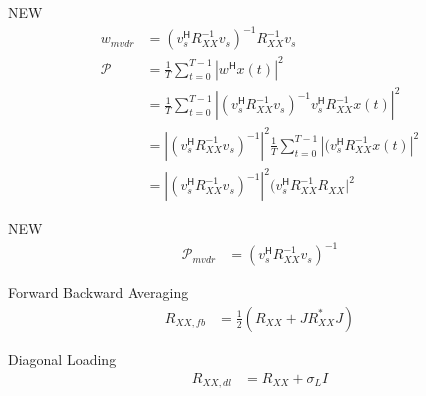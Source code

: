 \documentclass{article}
\begin{document}
NEW
\begin{align*}
	w_{mvdr} &= (v_s^\mathsf{H} R_{XX}^{-1} v_s)^{-1} R_{XX}^{-1} v_s 
	\\
	\mathcal{P} &= \frac{1}{T} \sum_{t=0}^{T-1} | w^\mathsf{H} x(t) | ^2
	\\
	&= \frac{1}{T} \sum_{t=0}^{T-1} | (v_s^\mathsf{H} R_{XX}^{-1} v_s)^{-1} v_s ^\mathsf{H} R_{XX}^{-1}  x(t) | ^2
	\\
	&= \left| (v_s^\mathsf{H} R_{XX}^{-1} v_s)^{-1} \right| ^ 2 \frac{1}{T} \sum_{t=0}^{T-1} | ( v_s ^\mathsf{H} R_{XX}^{-1}  x(t) | ^2
	\\
	&= \left| (v_s^\mathsf{H} R_{XX}^{-1} v_s)^{-1} \right| ^ 2 ( v_s ^\mathsf{H} R_{XX}^{-1} R_{XX} | ^2
\end{align*}

NEW
\begin{align*}
	\mathcal{P}_{mvdr} &= (v_s^\mathsf{H} R_{XX}^{-1} v_s)^{-1} 
\end{align*}

Forward Backward Averaging
\begin{align*}
	R_{XX, fb} &= \frac{1}{2} \left( R_{XX} + J R_{XX}^* J  \right)
\end{align*}

Diagonal Loading
\begin{align*}
	R_{XX, dl} &= R_{XX} + \sigma_L I
\end{align*}
\end{document}
